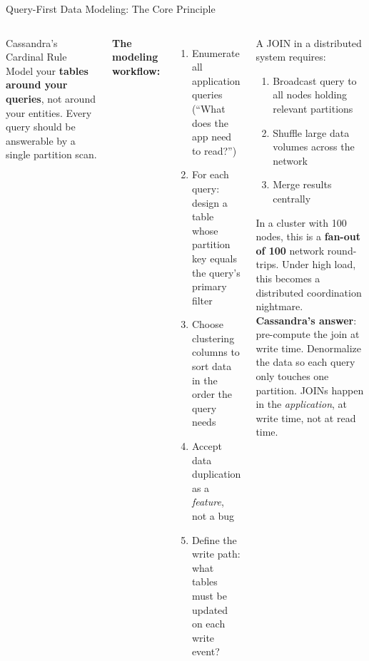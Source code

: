 \documentclass[aspectratio=169]{beamer}
\begin{document}
\begin{frame}{Query-First Data Modeling: The Core Principle}
  \begin{columns}[T]
      \begin{alertblock}{Cassandra's Cardinal Rule}
        \small Model your \textbf{tables around your queries}, not around your entities. Every query should be answerable by a single partition scan.
      \end{alertblock}
      \vspace{0.3cm}
      \textbf{The modeling workflow:}
      \begin{enumerate}\small
        \item Enumerate all application queries (``What does the app need to read?'')
        \item For each query: design a table whose partition key equals the query's primary filter
        \item Choose clustering columns to sort data in the order the query needs
        \item Accept data duplication as a \textit{feature}, not a bug
        \item Define the write path: what tables must be updated on each write event?
      \end{enumerate}
      \begin{tcolorbox}[deepdivebox, title={Deep Dive: Why No JOINs?}]
        \scriptsize
        A JOIN in a distributed system requires:
        \begin{enumerate}
          \item Broadcast query to all nodes holding relevant partitions
          \item Shuffle large data volumes across the network
          \item Merge results centrally
        \end{enumerate}
        In a cluster with 100 nodes, this is a \textbf{fan-out of 100} network round-trips. Under high load, this becomes a distributed coordination nightmare.
        \vspace{0.1cm}\\
        \textbf{Cassandra's answer}: pre-compute the join at write time. Denormalize the data so each query only touches one partition. JOINs happen in the \textit{application}, at write time, not at read time.
      \end{tcolorbox}
  \end{columns}
\end{frame}
\end{document}
